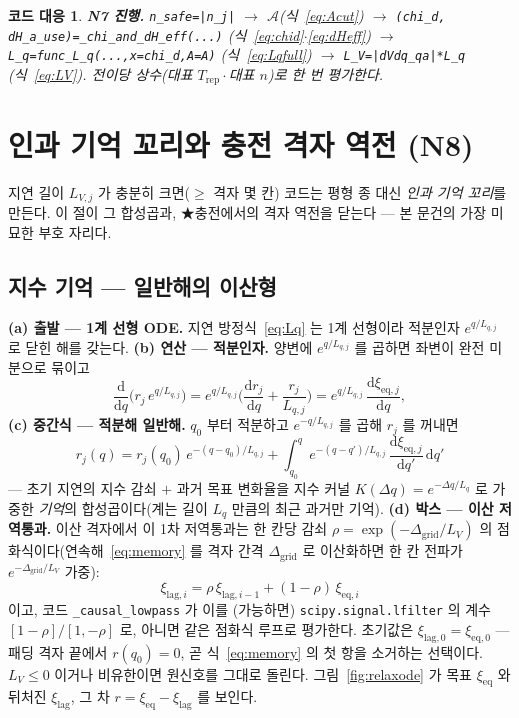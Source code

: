 \documentclass[11pt,a4paper]{article}
\newtheorem*{codebox}{코드 대응}
\newcommand{\dd}{\mathrm{d}}
\newcommand{\eq}{\mathrm{eq}}
\newcommand{\rep}{\mathrm{rep}}
\newcommand{\code}[1]{\texttt{#1}}
\begin{document}
\begin{codebox}
\textbf{N7 진행.} \code{n\_safe=|n\_j|} $\to$ $\mathcal A$(식~\eqref{eq:Acut}) $\to$
\code{(chi\_d, dH\_a\_use)=\_chi\_and\_dH\_eff(...)} (식~\eqref{eq:chid}$\cdot$\eqref{eq:dHeff}) $\to$
\code{L\_q=func\_L\_q(...,x=chi\_d,A=A)} (식~\eqref{eq:Lqfull}) $\to$ \code{L\_V=|dVdq\_qa|*L\_q} (식~\eqref{eq:LV}).
전이당 \emph{상수}(대표 $T_\rep\cdot$대표 $n$)로 한 번 평가한다.
\end{codebox}

\section{인과 기억 꼬리와 충전 격자 역전 (N8)}\label{sec:tail}
지연 길이 $L_{V,j}$ 가 충분히 크면($\ge$ 격자 몇 칸) 코드는 평형 종 대신 \emph{인과 기억 꼬리}를 만든다. 이 절이 그
합성곱과, ★충전에서의 격자 역전을 닫는다 — 본 문건의 가장 미묘한 부호 자리다.

\subsection{지수 기억 — 일반해의 이산형}
\textbf{(a) 출발 — 1계 선형 ODE.} 지연 방정식~\eqref{eq:Lq} 는 1계 선형이라 적분인자 $e^{q/L_{q,j}}$ 로 닫힌 해를 갖는다.
\textbf{(b) 연산 — 적분인자.} 양변에 $e^{q/L_{q,j}}$ 를 곱하면 좌변이 완전 미분으로 묶이고
\begin{equation}
\frac{\dd}{\dd q}\Big(r_j\,e^{q/L_{q,j}}\Big)
=e^{q/L_{q,j}}\Big(\frac{\dd r_j}{\dd q}+\frac{r_j}{L_{q,j}}\Big)
=e^{q/L_{q,j}}\,\frac{\dd\xi_{\eq,j}}{\dd q},
\label{eq:intfactor}
\end{equation}
\textbf{(c) 중간식 — 적분해 일반해.} $q_0$ 부터 적분하고 $e^{-q/L_{q,j}}$ 를 곱해 $r_j$ 를 꺼내면
\begin{equation}
r_j(q)=r_j(q_0)\,e^{-(q-q_0)/L_{q,j}}
+\int_{q_0}^{q}e^{-(q-q')/L_{q,j}}\,\frac{\dd\xi_{\eq,j}}{\dd q'}\,\dd q'
\label{eq:memory}
\end{equation}
— 초기 지연의 지수 감쇠 $+$ 과거 목표 변화율을 지수 커널 $K(\Delta q)=e^{-\Delta q/L_q}$ 로 가중한 \emph{기억}의
합성곱이다(계는 길이 $L_q$ 만큼의 최근 과거만 기억). \textbf{(d) 박스 — 이산 저역통과.} 이산 격자에서 이 1차 저역통과는
한 칸당 감쇠 $\rho=\exp(-\Delta_\mathrm{grid}/L_V)$ 의 점화식이다(연속해~\eqref{eq:memory} 를 격자 간격 $\Delta_\mathrm{grid}$
로 이산화하면 한 칸 전파가 $e^{-\Delta_\mathrm{grid}/L_V}$ 가중):
\begin{equation}
\xi_{\mathrm{lag},i}=\rho\,\xi_{\mathrm{lag},i-1}+(1-\rho)\,\xi_{\eq,i}
\label{eq:lowpass}
\end{equation}
이고, 코드 \code{\_causal\_lowpass} 가 이를 (가능하면) \code{scipy.signal.lfilter} 의 계수
$[1-\rho]/[1,-\rho]$ 로, 아니면 같은 점화식 루프로 평가한다. 초기값은 $\xi_{\mathrm{lag},0}=\xi_{\eq,0}$ —
패딩 격자 끝에서 $r(q_0)=0$, 곧 식~\eqref{eq:memory} 의 첫 항을 소거하는 선택이다. $L_V\le0$ 이거나 비유한이면 원신호를 그대로 돌린다.
그림~\ref{fig:relaxode} 가 목표 $\xi_\eq$ 와 뒤처진 $\xi_\mathrm{lag}$, 그 차 $r=\xi_\eq-\xi_\mathrm{lag}$ 를 보인다.
\end{document}
